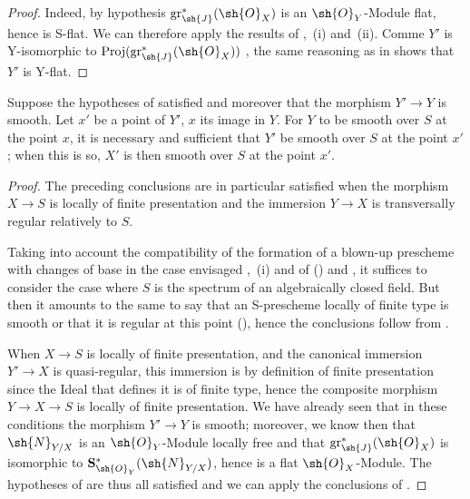 \begin{proof}
Indeed, by hypothesis $\operatorname{gr}_\sh{J}^*(\sh{O}_X)$ is an $\sh{O}_Y$-Module flat, hence is S-flat.
We can therefore apply the results of ,~(i) and~(ii).
Comme $Y'$ is Y-isomorphic to $\operatorname{Proj}(\operatorname{gr}_\sh{J}^*(\sh{O}_X))$ , the same reasoning as in  shows that $Y'$ is Y-flat.
\end{proof}

\begin{proposition}[19.4.8]
\label{IV.19.4.8}
Suppose the hypotheses of  satisfied and moreover that the morphism $Y'\to Y$ is smooth.
Let $x'$ be a point of $Y'$, $x$ its image in $Y$.
For $Y$ to be smooth over $S$ at the point $x$, it is necessary and sufficient that $Y'$ be smooth over $S$ at the point $x'$; when this is so, $X'$ is then smooth over $S$ at the point $x'$.
\end{proposition}

\begin{proof}
The preceding conclusions are in particular satisfied when the morphism $X\to S$ is locally of finite presentation and the immersion $Y\to X$ is transversally regular relatively to $S$.

Taking into account the compatibility of the formation of a blown-up prescheme with changes of base in the case envisaged ,~(i) and of () and ,
it suffices to consider the case where $S$ is the spectrum of an algebraically closed field.
But then it amounts to the same to say that an S-prescheme locally of finite type is smooth or that it is regular at this point (), hence the conclusions follow from .

When $X\to S$ is locally of finite presentation, and the canonical immersion $Y'\to X$ is quasi-regular, this immersion is by definition of finite presentation since the Ideal that defines it is of finite type, hence the composite morphism $Y\to X\to S$ is locally of finite presentation.
We have already seen  that in these conditions the morphism $Y'\to Y$ is smooth; moreover, we know then that $\sh{N}_{Y/X}$ is an $\sh{O}_Y$-Module locally free and that $\operatorname{gr}_\sh{J}^*(\sh{O}_X)$ is isomorphic to $\mathbf{S}^*_{\sh{O}_Y}(\sh{N}_{Y/X})$, hence is a flat $\sh{O}_X$-Module.
The hypotheses of  are thus all satisfied and we can apply the conclusions of .
\end{proof}

